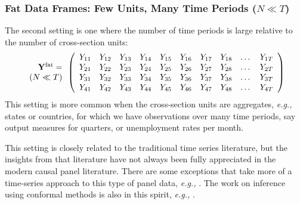 \documentclass[letterpaper,12pt,leqno]{article}
\newcommand{\fat}{{\rm fat}}
\newcommand{\by}{{\bf Y}}
\begin{document}
\subsubsection{Fat Data Frames: Few Units, Many Time Periods ($N\ll T$)}
The second setting is one where the number of time periods is large relative to the number of cross-section units:
\[
 \begin{array}{r}\by^\fat=\\ 
(N\ll T)
\end{array}
\left(
\begin{array}{cccccccccccc}
	Y_{11} & Y_{12} & Y_{13}   & Y_{14} & Y_{15} & Y_{16} & Y_{17} & Y_{18} &\dots & Y_{1T} \\
	Y_{21} & Y_{22}  & Y_{23}  & Y_{24} & Y_{25} & Y_{26} & Y_{27} & Y_{28}   & \dots & Y_{2T}  \\
	Y_{31}  & Y_{32} & Y_{33}  & Y_{34} & Y_{35}   & Y_{36} & Y_{37} & Y_{38} & \dots & Y_{3T}  \\
	 Y_{41}  & Y_{42} & Y_{43}  & Y_{44}  & Y_{45}& Y_{46}  & Y_{47} & Y_{48}   & \dots & Y_{4T}  \\
\end{array}
\right)
\]
This setting is more common when the cross-section units are aggregates, {\it e.g.,} states or countries, for which we have observations over many time periods, say output measures for quarters, or unemployment rates per month.


This setting is closely related to the traditional time series literature, but the insights from that literature have not always been fully appreciated in the modern causal panel literature. There are some exceptions that take more of a time-series approach to this type of panel data, {\it e.g.,} \citep{brodersen2015inferring, ben2023estimating}. The work on inference using conformal methods is also in this spirit, {\it e.g.,} \citep{chernozhukov2021exact}.
\end{document}
